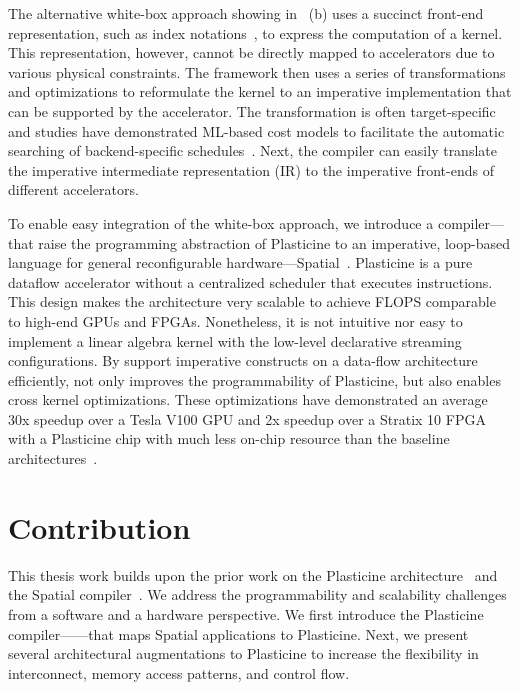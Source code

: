 The alternative white-box approach showing in~ (b) uses a succinct front-end
representation, such as index notations~\cite{taco}, to express the computation of a kernel.
This representation, however, cannot be directly mapped to accelerators due to various physical
constraints.
The framework then uses a series of transformations and optimizations to reformulate the kernel to an imperative implementation that can be supported by the accelerator. 
The transformation is often target-specific and studies have demonstrated ML-based cost models to
facilitate the automatic searching of backend-specific schedules~\cite{tvm}.
Next, the compiler can easily translate the imperative intermediate representation (IR) to the imperative front-ends of different
accelerators.

To enable easy integration of the white-box approach, we introduce a compiler--\name--that raise
the programming abstraction of Plasticine to an imperative, loop-based
language for general reconfigurable hardware---Spatial~\cite{spatial}.
Plasticine is a pure dataflow accelerator without a centralized scheduler that
executes instructions. This design makes the architecture very scalable to achieve FLOPS comparable
to high-end GPUs and FPGAs.
Nonetheless, it is not intuitive nor easy to implement a linear algebra kernel with the low-level
declarative streaming configurations.
By support imperative constructs on a data-flow architecture efficiently, \name not only improves
the programmability of Plasticine, but also enables cross kernel optimizations.
These optimizations have demonstrated an average 30x speedup over a Tesla V100 GPU and 2x speedup over
a Stratix 10 FPGA with a Plasticine chip with much less on-chip resource than the baseline architectures~\cite{tz_rnn}.

\section{Contribution}

This thesis work builds upon the prior work on the Plasticine architecture~\cite{plasticine} and the Spatial
compiler~\cite{spatial}.
We address the programmability and scalability challenges from a software
and a hardware perspective.
We first introduce the Plasticine compiler---\name---that maps Spatial applications to Plasticine.
Next, we present several architectural augmentations to Plasticine to increase the flexibility in interconnect, memory access patterns, and control flow.

